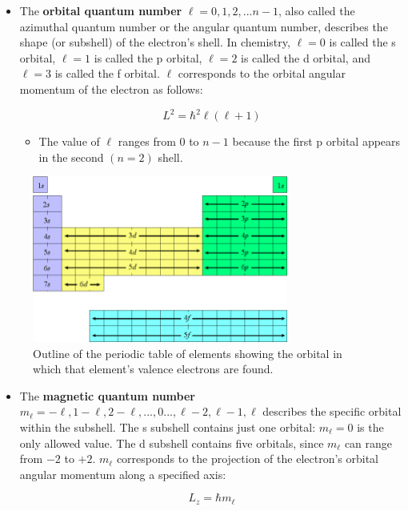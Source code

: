 \documentclass{article}
\newcommand{\be}{\begin{equation}}
\newcommand{\ee}{\end{equation}}
\begin{document}
\begin{itemize}
    \item The \textbf{orbital quantum number} $\ell = 0, 1, 2, ... n-1$, also called the azimuthal quantum number or the angular quantum number, describes the shape (or subshell) of the electron's shell. In chemistry,  $\ell = 0$ is called the s orbital, $\ell = 1$ is called the p orbital, $\ell = 2$ is called the d orbital, and $\ell = 3$ is called the f orbital. $\ell$ corresponds to the orbital angular momentum of the electron as follows:

\be
L^2 = \hbar^2 \ell (\ell + 1)
\ee
    \begin{itemize}
        \item The value of $\ell$ ranges from $0$ to $n-1$ because the first p orbital appears in the second $(n=2)$ shell.
    \end{itemize}
\end{itemize}

\begin{figure}[ht]
    \centering
    \includegraphics[width = 0.75\textwidth]{Periodictable.png}
    \caption{Outline of the periodic table of elements showing the orbital in which that element's valence electrons are found.}
    \label{fig:periodic}
\end{figure} 

\begin{itemize}
    \item The \textbf{magnetic quantum number} $m_\ell = -\ell, 1 - \ell, 2 - \ell, ..., 0 ..., \ell - 2, \ell - 1, \ell$ describes the specific orbital within the subshell. The s subshell contains just one orbital: $m_\ell = 0$ is the only allowed value. The d subshell contains five orbitals, since $m_\ell$ can range from $-2$ to $+2$. $m_\ell$ corresponds to the projection of the electron's orbital angular momentum along a specified axis:
    
    \be
    L_z = \hbar m_\ell
    \ee
    
\end{itemize}
\end{document}
